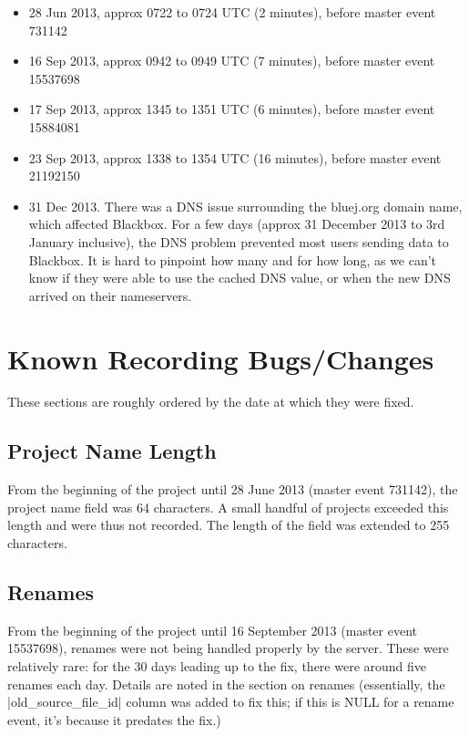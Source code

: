 \documentclass{report}
\begin{document}
\begin{itemize}
\item 28 Jun 2013, approx 0722 to 0724 UTC (2 minutes), before master event 731142
\item 16 Sep 2013, approx 0942 to 0949 UTC (7 minutes), before master event 15537698
\item 17 Sep 2013, approx 1345 to 1351 UTC (6 minutes), before master event 15884081
\item 23 Sep 2013, approx 1338 to 1354 UTC (16 minutes), before master event 21192150
\item 31 Dec 2013.  There was a DNS issue surrounding the bluej.org domain name, which affected Blackbox.  For a few days (approx 31 December 2013 to 3rd January inclusive), the DNS problem prevented most users sending data to Blackbox.  It is hard to pinpoint how many and for how long, as we can't know if they were able to use the cached DNS value, or when the new DNS arrived on their nameservers.
\end{itemize}

\section{Known Recording Bugs/Changes}

These sections are roughly ordered by the date at which they were fixed.

\subsection{Project Name Length}

From the beginning of the project until 28 June 2013 (master event 731142), the project name field was 64 characters.  A small handful of projects exceeded this length and were thus not recorded.  The length of the field was extended to 255 characters.

\subsection{Renames}

From the beginning of the project until 16 September 2013 (master event 15537698), renames were not being handled properly by the server.  These were relatively rare: for the 30 days leading up to the fix, there were around five renames each day.  Details are noted in the section on renames (essentially, the |old_source_file_id| column was added to fix this; if this is NULL for a rename event, it's because it predates the fix.)
\end{document}
